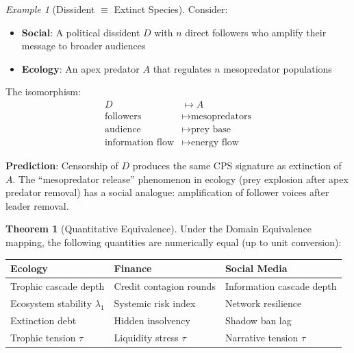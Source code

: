 \documentclass[12pt,a4paper]{article}
\theoremstyle{definition}
\newtheorem{theorem}{Theorem}[section]
\theoremstyle{remark}
\newtheorem{example}{Example}[section]
\begin{document}
\begin{example}[Dissident $\equiv$ Extinct Species]
Consider:
\begin{itemize}
    \item \textbf{Social}: A political dissident $D$ with $n$ direct followers who amplify their message to broader audiences
    \item \textbf{Ecology}: An apex predator $A$ that regulates $n$ mesopredator populations
\end{itemize}

The isomorphism:
\begin{align}
    D &\mapsto A \\
    \text{followers} &\mapsto \text{mesopredators} \\
    \text{audience} &\mapsto \text{prey base} \\
    \text{information flow} &\mapsto \text{energy flow}
\end{align}

\textbf{Prediction}: Censorship of $D$ produces the same CPS signature as extinction of $A$. The ``mesopredator release'' phenomenon in ecology (prey explosion after apex predator removal) has a social analogue: amplification of follower voices after leader removal.
\end{example}

\begin{theorem}[Quantitative Equivalence]
\label{thm:quant-equiv}
Under the Domain Equivalence mapping, the following quantities are numerically equal (up to unit conversion):

\begin{center}
\renewcommand{\arraystretch}{1.4}
\begin{tabular}{p{3.5cm}p{3.5cm}p{3.5cm}}
\toprule
\textbf{Ecology} & \textbf{Finance} & \textbf{Social Media} \\
\midrule
Trophic cascade depth & Credit contagion rounds & Information cascade depth \\
\addlinespace
Ecosystem stability $\lambda_1$ & Systemic risk index & Network resilience \\
\addlinespace
Extinction debt & Hidden insolvency & Shadow ban lag \\
\addlinespace
Trophic tension $\tau$ & Liquidity stress $\tau$ & Narrative tension $\tau$ \\
\bottomrule
\end{tabular}
\end{center}
\end{theorem}
\end{document}
